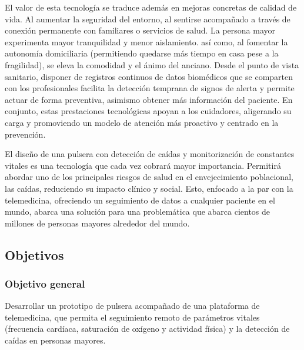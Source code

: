 \documentclass[12pt, a4paper]{article}
\begin{document}
    El valor de esta tecnología se traduce además en mejoras concretas de calidad de vida. Al aumentar la seguridad del entorno, al sentirse acompañado a través de conexión permanente con familiares o servicios de salud. La persona mayor experimenta mayor tranquilidad y menor aislamiento\cite{Reina2024}. así como, al fomentar la autonomía domiciliaria (permitiendo quedarse más tiempo en casa pese a la fragilidad), se eleva la comodidad y el ánimo del anciano\cite{Reina2024}. Desde el punto de vista sanitario, disponer de registros continuos de datos biomédicos que se comparten con los profesionales facilita la detección temprana de signos de alerta y permite actuar de forma preventiva, asimismo obtener más información del paciente. En conjunto, estas prestaciones tecnológicas apoyan a los cuidadores, aligerando su carga y promoviendo un modelo de atención más proactivo y centrado en la prevención.
    
    El diseño de una pulsera con detección de caídas y monitorización de constantes vitales es una tecnología que cada vez cobrará mayor importancia. Permitirá abordar uno de los principales riesgos de salud en el envejecimiento poblacional, las caídas, reduciendo su impacto clínico y social. Esto, enfocado a la par con la telemedicina, ofreciendo un seguimiento de datos a cualquier paciente en el mundo, abarca una solución para una problemática que abarca cientos de millones de personas mayores alrededor del mundo.

	\subsection{Objetivos}
	
	\subsubsection{Objetivo general}
	Desarrollar un prototipo de pulsera acompañado de una plataforma de telemedicina, que permita el seguimiento remoto de parámetros vitales (frecuencia cardíaca, saturación de oxígeno y actividad física) y la detección de caídas en personas mayores.
	
\end{document}
